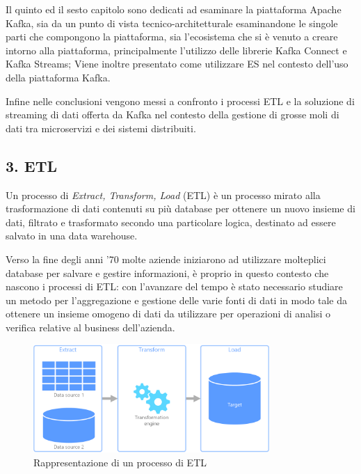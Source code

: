 \documentclass[]{article}
\begin{document}
Il quinto ed il sesto capitolo sono dedicati ad esaminare la piattaforma
Apache Kafka, sia da un punto di vista tecnico-architetturale
esaminandone le singole parti che compongono la piattaforma, sia
l'ecosistema che si è venuto a creare intorno alla piattaforma,
principalmente l'utilizzo delle librerie Kafka Connect e Kafka Streams;
Viene inoltre presentato come utilizzare ES nel contesto dell'uso della
piattaforma Kafka.

Infine nelle conclusioni vengono messi a confronto i processi ETL e la
soluzione di streaming di dati offerta da Kafka nel contesto della
gestione di grosse moli di dati tra microservizi e dei sistemi
distribuiti.

\newpage

\hypertarget{etl}{\subsection{3. ETL}\label{etl}}

Un processo di \emph{Extract, Transform, Load} (ETL) è un processo
mirato alla trasformazione di dati contenuti su più database per
ottenere un nuovo insieme di dati, filtrato e trasformato secondo una
particolare logica, destinato ad essere salvato in una data warehouse.

Verso la fine degli anni '70 molte aziende iniziarono ad utilizzare
molteplici database per salvare e gestire informazioni, è proprio in
questo contesto che nascono i processi di ETL: con l'avanzare del tempo
è stato necessario studiare un metodo per l'aggregazione e gestione
delle varie fonti di dati in modo tale da ottenere un insieme omogeno di
dati da utilizzare per operazioni di analisi o verifica relative al
business dell'azienda.

\begin{figure}
\centering
\includegraphics[width=0.80000\textwidth]{../images/etl.png}
\caption{Rappresentazione di un processo di ETL \label{figure_4}}
\end{figure}
\end{document}
